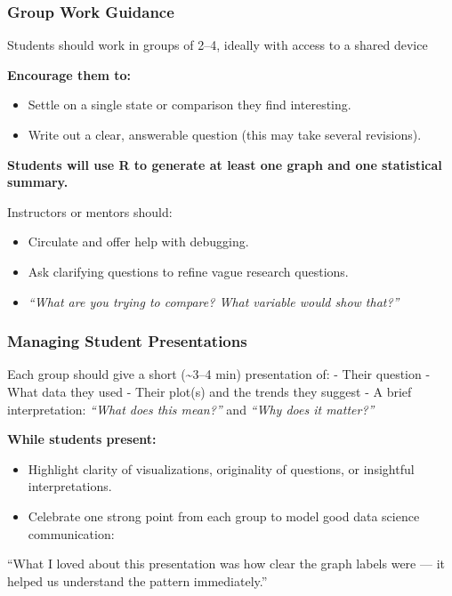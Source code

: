 \documentclass[
  letterpaper,
  DIV=11,
  numbers=noendperiod,
  oneside]{scrartcl}
\begin{document}
\hypertarget{group-work-guidance}{%
\subsubsection{Group Work Guidance}\label{group-work-guidance}}

Students should work in groups of 2--4, ideally with access to a shared
device

\textbf{Encourage them to:}

\begin{itemize}
\item
  Settle on a single state or comparison they find interesting.
\item
  Write out a clear, answerable question (this may take several
  revisions).
\end{itemize}

\textbf{Students will use R to generate at least one graph and one
statistical summary.}

Instructors or mentors should:

\begin{itemize}
\item
  Circulate and offer help with debugging.
\item
  Ask clarifying questions to refine vague research questions.
\item
  \emph{``What are you trying to compare? What variable would show
  that?''}
\end{itemize}

\hypertarget{managing-student-presentations}{%
\subsubsection{Managing Student
Presentations}\label{managing-student-presentations}}

Each group should give a short (\textasciitilde3--4 min) presentation
of: - Their question - What data they used - Their plot(s) and the
trends they suggest - A brief interpretation: \emph{``What does this
mean?''} and \emph{``Why does it matter?''}

\textbf{While students present:}

\begin{itemize}
\item
  Highlight clarity of visualizations, originality of questions, or
  insightful interpretations.
\item
  Celebrate one strong point from each group to model good data science
  communication:
\end{itemize}

``What I loved about this presentation was how clear the graph labels
were --- it helped us understand the pattern immediately.''
\end{document}

